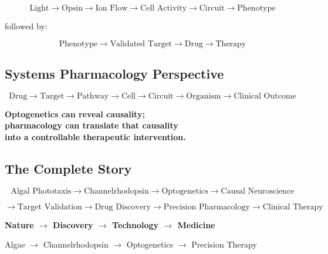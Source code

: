 \documentclass[11pt]{article}
\begin{document}
\[
\boxed{
\text{Light} \rightarrow \text{Opsin} \rightarrow \text{Ion Flow}
\rightarrow \text{Cell Activity} \rightarrow \text{Circuit}
\rightarrow \text{Phenotype}
}
\]

followed by:

\[
\boxed{
\text{Phenotype} \rightarrow \text{Validated Target}
\rightarrow \text{Drug} \rightarrow \text{Therapy}
}
\]

\subsection{Systems Pharmacology Perspective}

\[
\boxed{
\text{Drug} \rightarrow \text{Target} \rightarrow \text{Pathway}
\rightarrow \text{Cell} \rightarrow \text{Circuit}
\rightarrow \text{Organism} \rightarrow \text{Clinical Outcome}
}
\]

\begin{tcolorbox}[colback=Gold!8,colframe=Gold!80!black,
  title=\textbf{The Translational Principle},fonttitle=\bfseries]
\begin{center}
\Large
\textbf{
Optogenetics can reveal causality;\\
pharmacology can translate that causality\\
into a controllable therapeutic intervention.
}
\end{center}
\end{tcolorbox}

\subsection{The Complete Story}

\[
\boxed{
\text{Algal Phototaxis} \rightarrow \text{Channelrhodopsin}
\rightarrow \text{Optogenetics} \rightarrow \text{Causal Neuroscience}
}
\]

\[
\boxed{
\rightarrow \text{Target Validation} \rightarrow \text{Drug Discovery}
\rightarrow \text{Precision Pharmacology} \rightarrow \text{Clinical Therapy}
}
\]

\begin{center}
{\color{Maroon}\Huge
\textbf{Nature $\rightarrow$ Discovery $\rightarrow$ Technology $\rightarrow$ Medicine}}

\vspace{0.5cm}

{\color{SteelBlue}\Large
Algae $\rightarrow$ Channelrhodopsin $\rightarrow$ Optogenetics $\rightarrow$ Precision Therapy}
\end{center}
\end{document}
